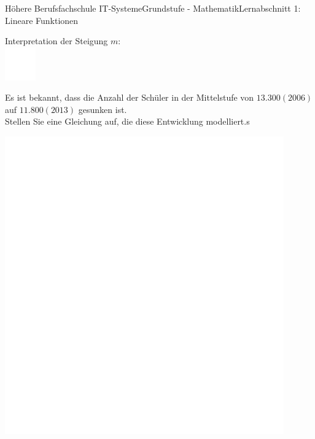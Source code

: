 \documentclass[oneside,openany,headings=optiontotoc,11pt,numbers=noenddot]{scrreprt}
\begin{document}
\begin{worksheet}{Höhere Berufsfachschule IT-Systeme}{Grundstufe - Mathematik}{Lernabschnitt 1: Lineare Funktionen}
\begin{framed}
		\end{framed}
		\normalsize
		\begin{framed}
			\noindent
			Interpretation der Steigung \(m\):\\
			\includegraphics[width=0.1\textwidth]{../../empty.jpg}\\
		\end{framed}
		\par\bigskip\noindent
		\begin{framed}
			\noindent
			Es ist bekannt, dass die Anzahl der Schüler in der Mittelstufe von \(13.300 (2006)\) auf \(11.800 (2013)\) gesunken ist.\\
			Stellen Sie eine Gleichung auf, die diese Entwicklung modelliert.s
		\end{framed}
		\begin{framed}
			\includegraphics[width=0.9\textwidth]{../../empty.jpg}
		\end{framed}
	\end{worksheet}
\end{document}
